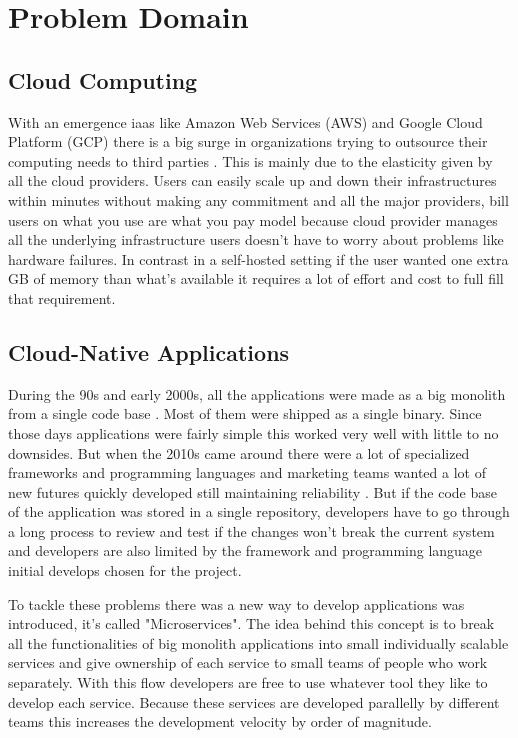 

{\let\clearpage\relax \chapter{Problem Domain}}

\section{Cloud Computing}
With an emergence \ac{iaas} like Amazon Web Services (AWS) and Google Cloud Platform (GCP) there is a big surge in organizations trying to outsource their computing needs to third parties \citep{rimol_2021}. This is mainly due to the elasticity given by all the cloud providers. Users can easily scale up and down their infrastructures within minutes without making any commitment and all the major providers, bill users on what you use are what you pay model because cloud provider manages all the underlying infrastructure users doesn't have to worry about problems like hardware failures. In contrast in a self-hosted setting if the user wanted one extra GB of memory than what's available it requires a lot of effort and cost to full fill that requirement.

\section{Cloud-Native Applications}
During the 90s and early 2000s, all the applications were made as a big monolith from a single code base \citep{LessonsF52:online}. Most of them were shipped as a single binary. Since those days applications were fairly simple this worked very well with little to no downsides. But when the 2010s came around there were a lot of specialized frameworks and programming languages and marketing teams wanted a lot of new futures quickly developed still maintaining reliability \citep{di2018migrating,Microser52:online}. But if the code base of the application was stored in a single repository, developers have to go through a long process to review and test if the changes won't break the current system and developers are also limited by the framework and programming language initial develops chosen for the project.

To tackle these problems there was a new way to develop applications was introduced, it's called "Microservices". The idea behind this concept is to break all the functionalities of big monolith applications into small individually scalable services and give ownership of each service to small teams of people who work separately. With this flow developers are free to use whatever tool they like to develop each service. Because these services are developed parallelly by different teams this increases the development velocity by order of magnitude. \citep{Understa56:online}

